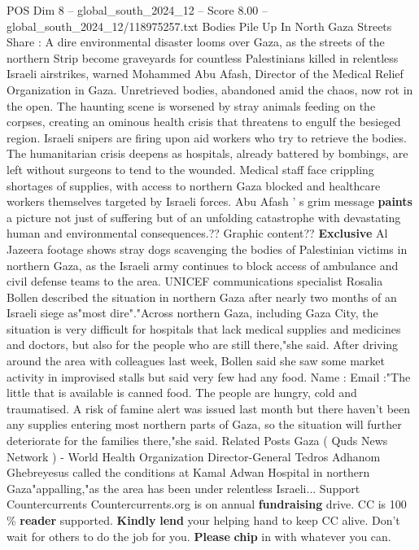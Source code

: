 \begin{textsample}{POS Dim 8 – global\_south\_2024\_12 – Score 8.00 – global\_south\_2024\_12/118975257.txt}  \label{ex:f8_pos_068}
Bodies Pile Up In North Gaza Streets Share : A dire environmental disaster looms over Gaza, as the streets of the northern Strip become graveyards for countless Palestinians killed in relentless Israeli airstrikes, warned Mohammed Abu Afash, Director of the Medical Relief Organization in Gaza.
Unretrieved bodies, abandoned amid the chaos, now rot in the open.
The haunting scene is worsened by stray animals feeding on the corpses, creating an ominous health crisis that threatens to engulf the besieged region.
Israeli snipers are firing upon aid workers who try to retrieve the bodies.
The humanitarian crisis deepens as hospitals, already battered by bombings, are left without surgeons to tend to the wounded.
Medical staff face crippling shortages of supplies, with access to northern Gaza blocked and healthcare workers themselves targeted by Israeli forces.
Abu Afash ' s grim message \textbf{paints} a picture not just of suffering but of an unfolding catastrophe with devastating human and environmental consequences.??
Graphic content?? \textbf{Exclusive} Al Jazeera footage shows stray dogs scavenging the bodies of Palestinian victims in northern Gaza, as the Israeli army continues to block access of ambulance and civil defense teams to the area.
UNICEF communications specialist Rosalia Bollen described the situation in northern Gaza after nearly two months of an Israeli siege as"most dire"."Across northern Gaza, including Gaza City, the situation is very difficult for hospitals that lack medical supplies and medicines and doctors, but also for the people who are still there,"she said.
After driving around the area with colleagues last week, Bollen said she saw some market activity in improvised stalls but said very few had any food.
Name : Email :"The little that is available is canned food.
The people are hungry, cold and traumatised.
A risk of famine alert was issued last month but there haven't been any supplies entering most northern parts of Gaza, so the situation will further deteriorate for the families there,"she said.
Related Posts Gaza ( Quds News Network ) - World Health Organization Director-General Tedros Adhanom Ghebreyesus called the conditions at Kamal Adwan Hospital in northern Gaza"appalling,"as the area has been under relentless Israeli...
Support Countercurrents Countercurrents.org is on annual \textbf{fundraising} drive.
CC is 100 \% \textbf{reader} supported. \textbf{Kindly} \textbf{lend} your helping hand to keep CC alive.
Don't wait for others to do the job for you. \textbf{Please} \textbf{chip} in with whatever you can.

\end{textsample}

